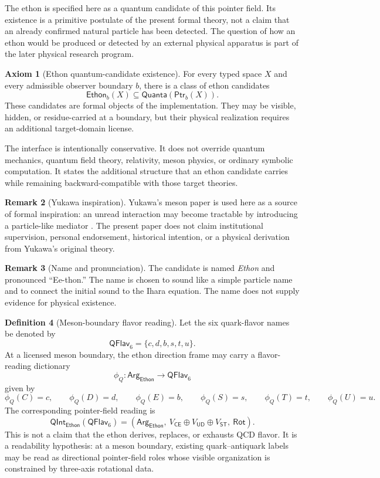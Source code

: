 \documentclass[11pt]{article}
\theoremstyle{definition}
\newtheorem{definition}{Definition}[section]
\newtheorem{axiom}[definition]{Axiom}
\newtheorem{remark}[definition]{Remark}
\theoremstyle{plain}
\newcommand{\Eth}{\mathsf{Ethon}}
\newcommand{\CE}{\mathsf{CE}}
\newcommand{\UD}{\mathsf{UD}}
\newcommand{\ST}{\mathsf{ST}}
\newcommand{\Arg}{\mathsf{Arg}}
\newcommand{\Rot}{\mathsf{Rot}}
\newcommand{\Qflav}{\mathsf{QFlav}}
\newcommand{\Qint}{\mathsf{QInt}}
\newcommand{\Ptr}{\mathsf{Ptr}}
\newcommand{\Quanta}{\mathsf{Quanta}}
\begin{document}
The ethon is specified here as a quantum candidate of this pointer field.
Its existence is a primitive postulate of the present formal theory, not
a claim that an already confirmed natural particle has been detected.
The question of how an ethon would be produced or detected by an external
physical apparatus is part of the later physical research program.

\begin{axiom}[Ethon quantum-candidate existence]
For every typed space \(X\) and every admissible observer boundary \(b\),
there is a class of ethon candidates
\[
  \Eth_b(X)\subseteq \Quanta(\Ptr_b(X)).
\]
These candidates are formal objects of the implementation.  They may
be visible, hidden, or residue-carried at a boundary, but their physical
realization requires an additional target-domain license.
\end{axiom}

The interface is intentionally conservative.  It does not override quantum
mechanics, quantum field theory, relativity, meson physics, or ordinary
symbolic computation.  It states the additional structure that an ethon
candidate carries while remaining backward-compatible with those target
theories.

\begin{remark}[Yukawa inspiration]
Yukawa's meson paper is used here as a source of formal inspiration:
an unread interaction may become tractable by introducing a
particle-like mediator \cite{Yukawa1935}.  The present paper does not
claim institutional supervision, personal endorsement, historical
intention, or a physical derivation from Yukawa's original theory.
\end{remark}

\begin{remark}[Name and pronunciation]
The candidate is named \emph{Ethon} and pronounced ``Ee-thon.''  The name
is chosen to sound like a simple particle name and to connect the initial
sound to the Ihara equation.  The name does not supply evidence for
physical existence.
\end{remark}

\begin{definition}[Meson-boundary flavor reading]
Let the six quark-flavor names be denoted by
\[
  \Qflav_6
  =
  \{c,d,b,s,t,u\}.
\]
At a licensed meson boundary, the ethon direction frame may carry a
flavor-reading dictionary
\[
  \phi_Q:\Arg_{\Eth}\to\Qflav_6
\]
given by
\[
  \phi_Q(C)=c,\qquad
  \phi_Q(D)=d,\qquad
  \phi_Q(E)=b,\qquad
  \phi_Q(S)=s,\qquad
  \phi_Q(T)=t,\qquad
  \phi_Q(U)=u.
\]
The corresponding pointer-field reading is
\[
  \Qint_{\Eth}(\Qflav_6)
  =
  (\Arg_{\Eth},\ V_{\CE}\oplus V_{\UD}\oplus V_{\ST},\ \Rot).
\]
This is not a claim that the ethon derives, replaces, or exhausts QCD
flavor.  It is a readability hypothesis: at a meson boundary, existing
quark--antiquark labels may be read as directional pointer-field roles
whose visible organization is constrained by three-axis rotational data.
\end{definition}
\end{document}
